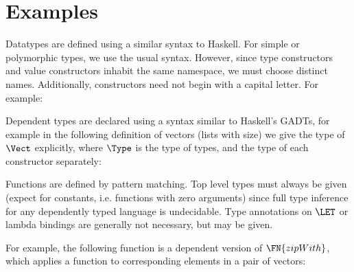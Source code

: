 \section{Examples}

Datatypes are defined using a similar syntax to Haskell. For simple or
polymorphic types, we use the usual syntax. However, since type
constructors and value constructors inhabit the same namespace, we
must choose distinct names. Additionally, constructors need not begin
with a capital letter. For example:


Dependent types are declared using a syntax similar to Haskell's
GADTs, for example in the following definition of vectors (lists with
size) we give the type of $\Vect$ explicitly, where $\Type$ is the
type of types, and the type of each constructor separately:


Functions are defined by pattern matching. Top level types must always
be given (expect for constants, i.e. functions with zero arguments)
since full type inference for any dependently typed language is
undecidable. Type annotations on $\LET$ or lambda bindings are
generally not necessary, but may be given.

For example, the following function is a dependent version of
$\FN{zipWith}$, which applies a function to corresponding elements in a
pair of vectors:


